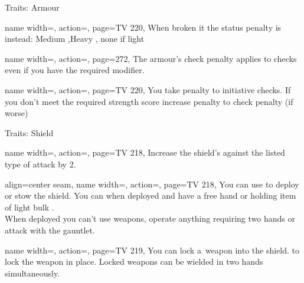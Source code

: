 \begin{PageBack}
\begin{Tables}{\backTableHeight}
\begin{Table}{Traits: Armour}
\begin{entry}{}{%
                name width=\conditionLength,%
                action=\Laminar,
                page=TV 220,
            }
                When broken it the status penalty is instead:
                \quad Medium ,\quad Heavy , \quad none if light
            \end{entry}%
            \begin{entry}{}{%
                name width=\conditionLength,%
                action=\Noisy,
                page=272,
            }
                The armour's check penalty applies to \StealthT checks even if you have the required \Strength modifier.
            \end{entry}%
            \begin{entry}{}{%
                name width=\conditionLength,%
                action=\Ponderous,
                page=TV 220,
            }
                You take  penalty to initiative checks.
                If you don't meet the required strength score increase penalty to check penalty {(if worse)}
            \end{entry}%
        \end{Table}
        \TableSpace
        \begin{Table}{Traits: Shield}
            \begin{entry}{}{%
                name width=\conditionLength,%
                action=\Deflecting,
                page=TV 218,
            }
                Increase the shield's \Hardness against the listed type of attack by 2.
            \end{entry}
            \begin{entry}{}{%
                align=center seam,
                name width=\conditionLength,%
                action=\Foldaway,
                page=TV 218,
            }
                You can use  to deploy or stow the shield.
                You can  when deployed and have a free hand or holding item of light bulk . \\
                When deployed you can't use weapons, operate anything requiring two hands or attack with the gauntlet.
            \end{entry}
            \begin{entry}{}{%
                name width=\conditionLength,%
                action=\Harnessed,
                page=TV 219,
            }
                You can lock a \Jousting\,weapon into the shield.  to lock the weapon in place.
                Locked weapons can be wielded in two hands simultaneously.\\

\end{entry}
\end{Table}
\end{Tables}
\end{PageBack}
